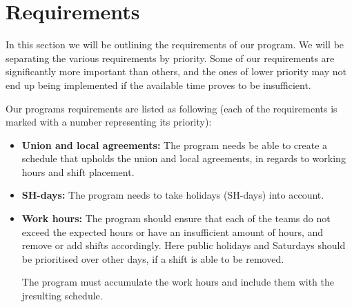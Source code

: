 \section{Requirements}
In this section we will be outlining the requirements of our program. We will be separating the various requirements by priority. Some of our requirements are significantly more important than others, and the ones of lower priority may not end up being implemented if the available time proves to be insufficient.

Our programs requirements are listed as following (each of the requirements is marked with a number representing its priority):
\begin{itemize}
    
    \item[] \textbf{Union and local agreements:} The program needs be able to create a schedule that upholds the union and local agreements, in regards to working hours and shift placement.
    
    \item[] \textbf{SH-days:} The program needs to take holidays (SH-days) into account.
    
    \item[] \textbf{Work hours:} The program should ensure that each of the teams do not exceed the expected hours or have an insufficient amount of hours, and remove or add shifts accordingly. Here public holidays and Saturdays should be prioritised over other days, if a shift is able to be removed.
    
    The program must accumulate the work hours and include them with the jresulting schedule.
    
    
    

\end{itemize}
